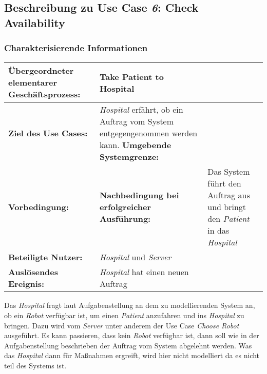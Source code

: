 
	\pagebreak


		\subsection{Beschreibung zu Use Case \emph{6}: Check Availability}

			\subsubsection*{Charakterisierende Informationen}

			\begin{table}[H]
				\centering
				\begin{tabularx}{\textwidth}{@{}p{5cm}X@{}}
				\hline
				\textbf{Übergeordneter elementarer Geschäftsprozess:} & Take Patient to Hospital  \\ \hline
				\textbf{Ziel des Use Cases:} & \emph{Hospital} erfährt, ob ein Auftrag vom System entgegengenommen werden kann. \hline
				\textbf{Umgebende Systemgrenze:} &  \\ \hline
				\textbf{Vorbedingung:} &  \hline
				\textbf{Nachbedingung bei erfolgreicher Ausführung:} & Das System führt den Auftrag aus und bringt den \emph{Patient} in das \emph{Hospital} \\ \hline
				\textbf{Beteiligte Nutzer:} & \emph{Hospital} und \emph{Server}\\ \hline
				\textbf{Auslösendes Ereignis:} & \emph{Hospital} hat einen neuen Auftrag\\
				\hline
				\end{tabularx}
			\end{table}

			Das \emph{Hospital} fragt laut Aufgabenstellung an dem zu modellierenden System an, ob ein \emph{Robot} verfügbar ist, um einen \emph{Patient} anzufahren und ins \emph{Hospital} zu bringen. Dazu wird vom \emph{Server} unter anderem der Use Case \emph{Choose Robot} ausgeführt. Es kann passieren, dass kein \emph{Robot} verfügbar ist, dann soll wie in der Aufgabenstellung beschrieben der Auftrag vom System abgelehnt werden. Was das \emph{Hospital} dann für Maßnahmen ergreift, wird hier nicht modelliert da es nicht teil des Systems ist.


	\pagebreak
